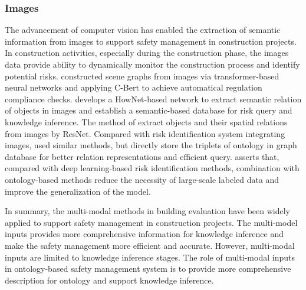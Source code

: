 \subsubsection*{Images}
The advancement of computer vision has enabled the extraction of semantic information from images to support safety management in construction projects.
In construction activities, especially during the construction phase, the images data provide ability to dynamically monitor the construction process and identify potential risks.
\cite{zhang2022automatic} constructed scene graphs from images via transformer-based neural networks and applying C-Bert to achieve automatical regulation compliance checks.
\cite{zhong2020ontology} develops a HowNet-based network to extract semantic relation of objects in images and establish a semantic-based database for 
risk query and knowledge inference. 
The method of \cite{fang2020knowledge} extract objects and their spatial relations from images by ResNet. Compared with risk identification system integrating images, \cite{fang2020knowledge} used similar methods, but directly store the triplets of ontology in graph database for better relation representations and efficient query. 
\cite{lee2023ontological} asserts that, compared with deep learning-based risk identification methods, combination with ontology-based methods reduce the necessity of large-scale labeled data and improve the generalization of the model.

In summary, the multi-modal methods in building evaluation have been widely applied to support safety management in construction projects.  
The multi-model inputs provides more comprehensive information for knowledge inference and make the safety management more efficient and accurate.
However, multi-modal inputs are limited to knowledge inference stages. 
The role of multi-modal inputs in ontology-based safety management system is to provide more comprehensive description for ontology and support knowledge inference.

